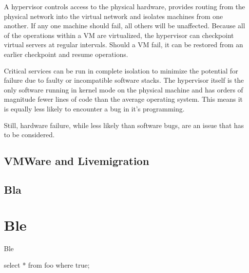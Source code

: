 \documentclass{scrartcl}
\begin{document}
A hypervisor controls access to the physical hardware, provides
routing from the physical network into the virtual network and
isolates machines from one another. If any one machine should fail,
all others will be unaffected. Because all of the operations within a
VM are virtualized, the hypervisor can checkpoint virtual servers at
regular intervals. Should a VM fail, it can be restored from an
earlier checkpoint and resume operations.

Critical services can be run in complete isolation to minimize the
potential for failure due to faulty or incompatible software
stacks. The hypervisor itself is the only software running in kernel
mode on the physical machine and has orders of magnitude fewer lines
of code than the average operating system. This means it is equally
less likely to encounter a bug in it's programming.

Still, hardware failure, while less likely than software bugs, are an 
issue that has to be considered.

\subsection{VMWare and Livemigration}
\label{sec:vmware}

\blindtext

\subsection{Bla}
\label{sec:bla}

\blindtext

\ParSep

\blindtext

\section{Ble}
\label{sec:ble}

Ble

\begin{code}[language=SQL]
select  * from foo where true;
\end{code}
\blinddocument

%
\end{document}
